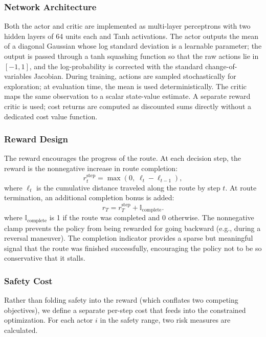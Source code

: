 \subsubsection{Network Architecture}

Both the actor and critic are implemented as multi-layer perceptrons with two hidden layers of 64 units each and Tanh activations. The actor outputs the mean of a diagonal Gaussian whose log standard deviation is a learnable parameter; the output is passed through a tanh squashing function so that the raw actions lie in $[-1,1]$, and the log-probability is corrected with the standard change-of-variables Jacobian. During training, actions are sampled stochastically for exploration; at evaluation time, the mean is used deterministically. The critic maps the same observation to a scalar state-value estimate. A separate reward critic is used; cost returns are computed as discounted sums directly without a dedicated cost value function.

\subsubsection{Reward Design}

The reward encourages the progress of the route. At each decision step, the reward is the nonnegative increase in route completion:
\begin{equation}
r_t^{\text{step}} = \max\!\left(0,\; \ell_t - \ell_{t-1}\right),
\end{equation}
where $\ell_t$ is the cumulative distance traveled along the route by step $t$. At route termination, an additional completion bonus is added:
\begin{equation}
r_T = r_T^{\text{step}} + \mathbb{I}_{\text{complete}}.
\end{equation}
where $\mathbb{I}_{\text{complete}}$ is 1 if the route was completed and 0 otherwise.
The nonnegative clamp prevents the policy from being rewarded for going backward (e.g., during a reversal maneuver). The completion indicator provides a sparse but meaningful signal that the route was finished successfully, encouraging the policy not to be so conservative that it stalls.

\subsubsection{Safety Cost}

Rather than folding safety into the reward (which conflates two competing objectives), we define a separate per-step cost that feeds into the constrained optimization. For each actor $i$ in the safety range, two risk measures are calculated.

